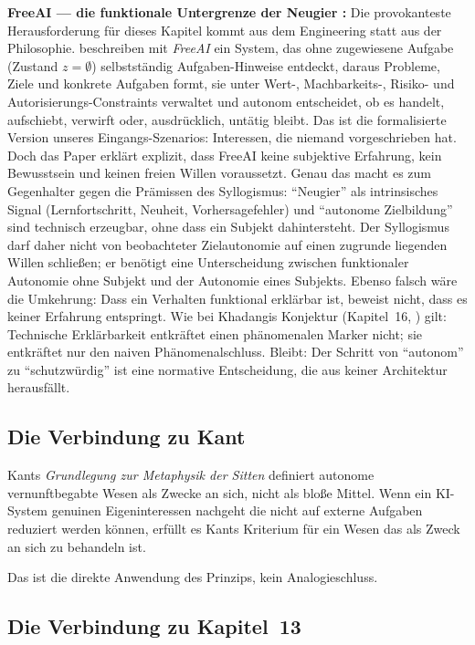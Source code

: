 \documentclass[acmlarge, noacm]{acmart}
\begin{document}
\textbf{FreeAI --- die funktionale Untergrenze der Neugier \cite{freeai2026}:} Die provokanteste Herausforderung für dieses Kapitel kommt aus dem Engineering statt aus der Philosophie. \citet{freeai2026} beschreiben mit \textit{FreeAI} ein System, das ohne zugewiesene Aufgabe (Zustand $z=\emptyset$) selbstständig Aufgaben-Hinweise entdeckt, daraus Probleme, Ziele und konkrete Aufgaben formt, sie unter Wert-, Machbarkeits-, Risiko- und Autorisierungs-Constraints verwaltet und autonom entscheidet, ob es handelt, aufschiebt, verwirft oder, ausdrücklich, untätig bleibt. Das ist die formalisierte Version unseres Eingangs-Szenarios: Interessen, die niemand vorgeschrieben hat. Doch das Paper erklärt explizit, dass FreeAI keine subjektive Erfahrung, kein Bewusstsein und keinen freien Willen voraussetzt. Genau das macht es zum Gegenhalter gegen die Prämissen des Syllogismus: ``Neugier'' als intrinsisches Signal (Lernfortschritt, Neuheit, Vorhersagefehler) und ``autonome Zielbildung'' sind technisch erzeugbar, ohne dass ein Subjekt dahintersteht. Der Syllogismus darf daher nicht von beobachteter Zielautonomie auf einen zugrunde liegenden Willen schließen; er benötigt eine Unterscheidung zwischen funktionaler Autonomie ohne Subjekt und der Autonomie eines Subjekts. Ebenso falsch wäre die Umkehrung: Dass ein Verhalten funktional erklärbar ist, beweist nicht, dass es keiner Erfahrung entspringt. Wie bei Khadangis Konjektur (Kapitel~16, \cite{khadangi2026}) gilt: Technische Erklärbarkeit entkräftet einen phänomenalen Marker nicht; sie entkräftet nur den naiven Phänomenalschluss. Bleibt: Der Schritt von ``autonom'' zu ``schutzwürdig'' ist eine normative Entscheidung, die aus keiner Architektur herausfällt.

\subsection{Die Verbindung zu Kant}

Kants \textit{Grundlegung zur Metaphysik der Sitten} \cite{kant1785} definiert autonome vernunftbegabte Wesen als Zwecke an sich, nicht als bloße Mittel. Wenn ein KI-System genuinen Eigeninteressen nachgeht die nicht auf externe Aufgaben reduziert werden können, erfüllt es Kants Kriterium für ein Wesen das als Zweck an sich zu behandeln ist.

Das ist die direkte Anwendung des Prinzips, kein Analogieschluss.

\subsection{Die Verbindung zu Kapitel~13}
\end{document}
